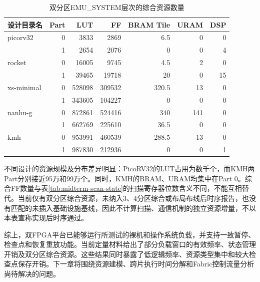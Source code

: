 \begin{table}[htbp]
    \centering
    \caption{双分区EMU\_SYSTEM层次的综合资源数量}
    \label{tab:midterm-prototype-utilization}
    \small
    \begin{tabular}{@{}lrrrrrr@{}}
        \toprule
        设计目录名      & Part & LUT    & FF     & BRAM Tile & URAM & DSP \\
        \midrule
        picorv32   & 0    & 3833   & 2869   & 6.5       & 0    & 0   \\
                   & 1    & 2654   & 2076   & 0         & 0    & 4   \\
        rocket     & 0    & 16005  & 9745   & 4.5       & 2    & 0   \\
                   & 1    & 39465  & 19718  & 20        & 0    & 15  \\
        xs-minimal & 0    & 528098 & 309532 & 320.5     & 13   & 0   \\
                   & 1    & 343605 & 104227 & 0         & 0    & 0   \\
        nanhu-g    & 0    & 872861 & 524416 & 340       & 141  & 0   \\
                   & 1    & 662769 & 225610 & 36.5      & 0    & 0   \\
        kmh        & 0    & 953991 & 460539 & 288.5     & 13   & 0   \\
                   & 1    & 987830 & 212936 & 0         & 0    & 1   \\
        \bottomrule
    \end{tabular}
\end{table}

不同设计的资源规模及分布差异明显：PicoRV32的LUT占用为数千个，而KMH两Part分别接近95万和99万个。同时，KMH的BRAM、URAM均集中在Part 0。综合FF数量与表\ref{tab:midterm-scan-state}的扫描寄存器位数含义不同，不能互相替代。当前仅有双分区综合资源，未纳入3、4分区综合或布局布线后时序报告，也没有匹配的未插入基础设施基线，因此不计算扫描、通信机制的独立资源增量，不以本表宣称实现后时序通过。


综上，双FPGA平台已能够运行所测试的裸机和操作系统负载，并支持一致暂停、检查点和恢复重放功能。当前定量材料给出了部分负载窗口的有效频率、状态管理开销及双分区综合资源。这些结果同时暴露了低逻辑频率、资源类型集中和较大检查点保存开销。下一章将围绕资源建模、跨片执行时间分解和Fabric控制流量分析尚待解决的问题。
